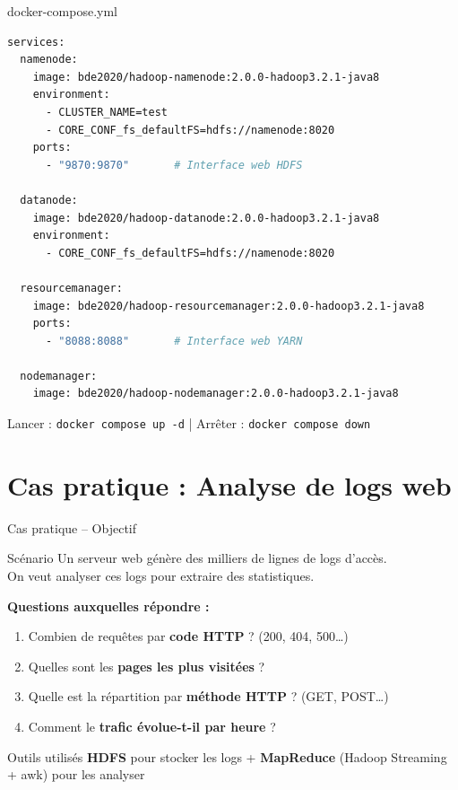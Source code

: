 \documentclass[aspectratio=169, 11pt]{beamer}
\begin{document}
\begin{frame}[fragile]{docker-compose.yml}
  \begin{lstlisting}[language=bash, basicstyle=\ttfamily\tiny]
services:
  namenode:
    image: bde2020/hadoop-namenode:2.0.0-hadoop3.2.1-java8
    environment:
      - CLUSTER_NAME=test
      - CORE_CONF_fs_defaultFS=hdfs://namenode:8020
    ports:
      - "9870:9870"       # Interface web HDFS

  datanode:
    image: bde2020/hadoop-datanode:2.0.0-hadoop3.2.1-java8
    environment:
      - CORE_CONF_fs_defaultFS=hdfs://namenode:8020

  resourcemanager:
    image: bde2020/hadoop-resourcemanager:2.0.0-hadoop3.2.1-java8
    ports:
      - "8088:8088"       # Interface web YARN

  nodemanager:
    image: bde2020/hadoop-nodemanager:2.0.0-hadoop3.2.1-java8
  \end{lstlisting}

  \vspace{0.3em}
  \small
   Lancer : \texttt{docker compose up -d} \quad|\quad
  Arrêter : \texttt{docker compose down}
\end{frame}

\section{Cas pratique : Analyse de logs web}

\begin{frame}{Cas pratique -- Objectif}
  \begin{block}{Scénario}
    Un serveur web génère des milliers de lignes de logs d'accès.\\
    On veut analyser ces logs pour extraire des statistiques.
  \end{block}

  \vspace{0.5em}

  \textbf{Questions auxquelles répondre :}
  \begin{enumerate}
    \item Combien de requêtes par \textbf{code HTTP} ? (200, 404, 500\ldots)
    \item Quelles sont les \textbf{pages les plus visitées} ?
    \item Quelle est la répartition par \textbf{méthode HTTP} ? (GET, POST\ldots)
    \item Comment le \textbf{trafic évolue-t-il par heure} ?
  \end{enumerate}

  \vspace{0.5em}

  \begin{exampleblock}{Outils utilisés}
    \textbf{HDFS} pour stocker les logs \quad + \quad \textbf{MapReduce} (Hadoop Streaming + awk) pour les analyser
  \end{exampleblock}
\end{frame}
\end{document}
